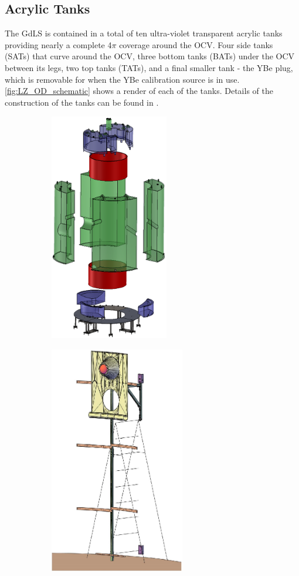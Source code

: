 \subsection{Acrylic Tanks}
\par
The GdLS is contained in a total of ten ultra-violet transparent acrylic tanks providing nearly a complete 4$\pi$ coverage around the OCV.
Four side tanks (SATs) that curve around the OCV, three bottom tanks (BATs) under the OCV between its legs, two top tanks (TATs), and a final smaller tank - the YBe plug, which is removable for when the YBe calibration source is in use.
\autoref{fig:LZ_OD_schematic} shows a render of each of the tanks.
Details of the construction of the tanks can be found in \cite{scotthaselschwardt_thesis_ref}.

\begin{figure}[]
  \begin{subfigure}{.5\textwidth}
  \centering
  \includegraphics[height=10cm]{Figures/LZ/OD_Tanks_CAD.png}
  \end{subfigure}
  \begin{subfigure}{.5\textwidth}
  \centering
  \includegraphics[height=10cm]{Figures/LZ/pmt_in_ladder.png}

\end{subfigure}
\end{figure}
